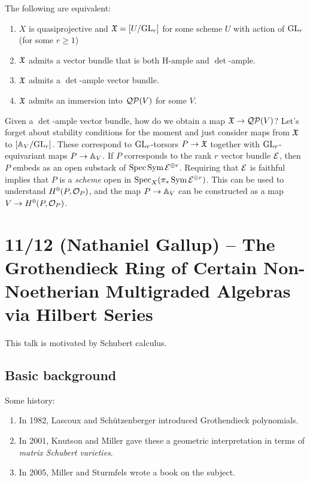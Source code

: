 \documentclass{amsart}
\begin{document}
\begin{thm}
	The following are equivalent:
	\begin{enumerate}
		\item $X$ is quasiprojective and $\Xfr = [U / \GL_r]$ for some scheme $U$ with action of $\GL_r$ (for some $r \geq 1$)
		\item $\Xfr$ admits a vector bundle that is both H-ample and $\det$-ample.
		\item $\Xfr$ admits a $\det$-ample vector bundle.
		\item $\Xfr$ admits an immersion into $\Qc\Pc(V)$ for some $V$.
	\end{enumerate}
\end{thm}

Given a $\det$-ample vector bundle, how do we obtain a map $\Xfr \to \Qc\Pc(V)$?
Let's forget about stability conditions for the moment and just consider maps from $\Xfr$ to $[\AA_V / \GL_r]$.
These correspond to $\GL_r$-torsors $P \to \Xfr$ together with $\GL_r$-equivariant maps $P \to \AA_V$.
If $P$ corresponds to the rank $r$ vector bundle $\Ec$, then $P$ embeds as an open substack of $\Spec \Sym \Ec^{\oplus r}$.
Requiring that $\Ec$ is faithful implies that $P$ is a \emph{scheme} open in $\Spec_X(\pi_* \Sym \Ec^{\oplus r})$.
This can be used to understand $H^0(P, \Oc_P)$, and the map $P \to \AA_V$ can be constructed as a map $V \to H^0(P, \Oc_P)$.

\section{11/12 (Nathaniel Gallup) -- The Grothendieck Ring of Certain Non-Noetherian Multigraded Algebras via Hilbert Series}

This talk is motivated by Schubert calculus.

\subsection{Basic background}

Some history:
\begin{enumerate}
	\item In 1982, Lascoux and Sch\"utzenberger introduced Grothendieck polynomials.
	\item In 2001, Knutson and Miller gave these a geometric interpretation in terms of \emph{matrix Schubert varieties}.
	\item In 2005, Miller and Sturmfels wrote a book on the subject.
\end{enumerate}
\end{document}
